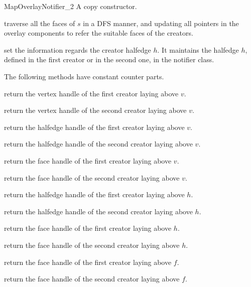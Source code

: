 \begin{ccRefConcept}{MapOverlayNotifier_2}
{A copy constructor.}

\ccOperations
{}
{traverse all the faces of $s$ in a DFS manner, and updating all pointers 
in the overlay components to refer the suitable faces of the creators.}

{set the information regards the creator halfedge $h$.
   It maintains the halfedge $h$, defined in the first creator or in the
   second one, in the notifier class.}


The following methods have constant counter parts.

{return the vertex handle of the first creator laying above $v$.}
  
{return the vertex handle of the second creator laying above $v$.}
  
{return the halfedge handle of the first creator laying above $v$.}

{return the halfedge handle of the second creator laying above $v$.}

{return the face handle of the first creator laying above $v$.}

{return the face handle of the second creator laying above $v$.}

{return the halfedge handle of the first creator laying above $h$.}

{return the halfedge handle of the second creator laying above $h$.}

{return the face handle of the first creator laying above $h$.}

{return the face handle of the second creator laying above $h$.}

{return the face handle of the first creator laying above $f$.}

{return the face handle of the second creator laying above $f$.}

\end{ccRefConcept} %

\ccRefPageEnd
